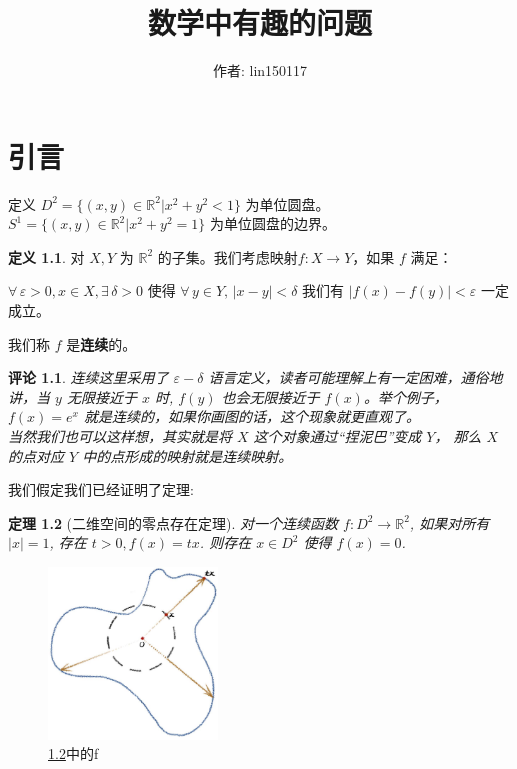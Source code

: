 \documentclass[UTF8,oneside,11pt]{book}
\title{
    \huge{数学中有趣的问题}
    \vspace{0.4\paperheight}
}
\author{
    \Large{作者: lin150117}
    \vspace{0.1\paperheight}
}
\theoremstyle{plain}\newtheorem{thm}{定理}[chapter]
\theoremstyle{definition}\newtheorem{definition}[thm]{定义}
\theoremstyle{plain}\newtheorem{axiom}[thm]{公理}
\theoremstyle{plain}\newtheorem{coro}[thm]{推论}
\theoremstyle{plain}\newtheorem{lemma}[thm]{引理}
\theoremstyle{plain}\newtheorem{prop}[thm]{性质}
\theoremstyle{plain}\newtheorem{conj}[thm]{猜想}
\theoremstyle{plain}\newtheorem{ques}[thm]{问题}
\theoremstyle{plain}\newtheorem{const}[thm]{构造}
\theoremstyle{remark}\newtheorem{notation}[thm]{注记}
\theoremstyle{plain}\newtheorem*{app}{应用}
\theoremstyle{plain}\newtheorem*{exam}{测试}
\theoremstyle{plain}\newtheorem*{exer}{例子}
\theoremstyle{plain}\newtheorem*{remark}{评论}
\theoremstyle{remark}\newtheorem*{note}{\small{注}}
\numberwithin{equation}{section}
\numberwithin{thm}{chapter}
\begin{document}
\maketitle
\frontmatter
\tableofcontents
\newpage
\setlength{\parindent}{0pt}
\chapter{引言}
\setcounter{chapter}{1}
定义 $ D^2=\{(x,y)\in\mathbb{R}^2|x^2+y^2<1\} $ 为单位圆盘。 $ S^1=\{(x,y)\in\mathbb{R}^2|x^2+y^2=1\} $ 为单位圆盘的边界。 
\begin{definition}
    对 $ X,Y  $ 为 $ \mathbb{R}^2 $ 的子集。我们考虑映射$ f:X\rightarrow Y $，如果 $ f  $ 满足：
    \begin{center}
        $ \forall \,\varepsilon>0,x\in 
        X,\exists\, \delta>0  $ 使得  $ \forall \,y\in Y,\,|x-y|<\delta  $ 我们有 $  |f(x)-f(y)|<\varepsilon $ 一定成立。
    \end{center}
    我们称 $ f  $ 是\textbf{连续}的。
\end{definition}
\begin{remark}
    连续这里采用了 $ \varepsilon-\delta  $ 语言定义，读者可能理解上有一定困难，通俗地讲，当 $ y $ 无限接近于 $ x $ 时, $ f(y) $ 也会无限接近于 $ f(x) $。举个例子， $ f(x)=e^x  $ 就是连续的，如果你画图的话，这个现象就更直观了。\\
    当然我们也可以这样想，其实就是将 $ X  $ 这个对象通过“捏泥巴”变成 $ Y  $， 那么 $ X $ 的点对应 $ Y  $ 中的点形成的映射就是连续映射。  
\end{remark}
我们假定我们已经证明了定理:
\begin{thm}[二维空间的零点存在定理]\label{定理1}
    对一个连续函数 $ f:D^2\rightarrow \mathbb{R}^2  $, 如果对所有 $ |x|=1 $, 存在 $ t>0,f(x)=tx $. 则存在 $ x\in D^2 $ 使得 $ f(x)=0 $. 
\end{thm}


\begin{figure}[htb]
    \centering
    \includegraphics[width=0.4\textwidth]{topo.jpg}
    \caption{\cref{定理1}中的f}
    \label{定理1中的f}
\end{figure}
\end{document}
